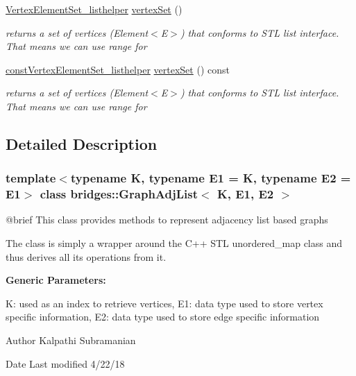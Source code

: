 \begin{DoxyCompactItemize}
\item 
\mbox{\hyperlink{classbridges_1_1_graph_adj_list_1_1_vertex_element_set__listhelper}{Vertex\+Element\+Set\+\_\+listhelper}} \mbox{\hyperlink{classbridges_1_1_graph_adj_list_ab81f0eb58b7e94a05f13244c8557a744}{vertex\+Set}} ()
\begin{DoxyCompactList}\small\item\em returns a set of vertices (Element$<$\+E$>$) that conforms to S\+TL list interface. That means we can use range for \end{DoxyCompactList}\item 
\mbox{\hyperlink{classbridges_1_1_graph_adj_list_1_1const_vertex_element_set__listhelper}{const\+Vertex\+Element\+Set\+\_\+listhelper}} \mbox{\hyperlink{classbridges_1_1_graph_adj_list_a629eb850df8bad758a848e8311069a63}{vertex\+Set}} () const
\begin{DoxyCompactList}\small\item\em returns a set of vertices (Element$<$\+E$>$) that conforms to S\+TL list interface. That means we can use range for \end{DoxyCompactList}\end{DoxyCompactItemize}


\subsection{Detailed Description}
\subsubsection*{template$<$typename K, typename E1 = K, typename E2 = E1$>$\newline
class bridges\+::\+Graph\+Adj\+List$<$ K, E1, E2 $>$}

\begin{DoxyVerb}@brief This class provides methods to represent adjacency list
based graphs

The class is simply a wrapper around the C++ STL unordered_map class
and thus derives all its operations from it.
\end{DoxyVerb}


{\bfseries{Generic Parameters\+:}} \begin{DoxyVerb}     K:  used as an index to retrieve vertices,
     E1: data type used to store vertex specific information,
     E2: data type used to store edge specific information
\end{DoxyVerb}


\begin{DoxyAuthor}{Author}
Kalpathi Subramanian 
\end{DoxyAuthor}
\begin{DoxyDate}{Date}
Last modified 4/22/18 
\end{DoxyDate}


